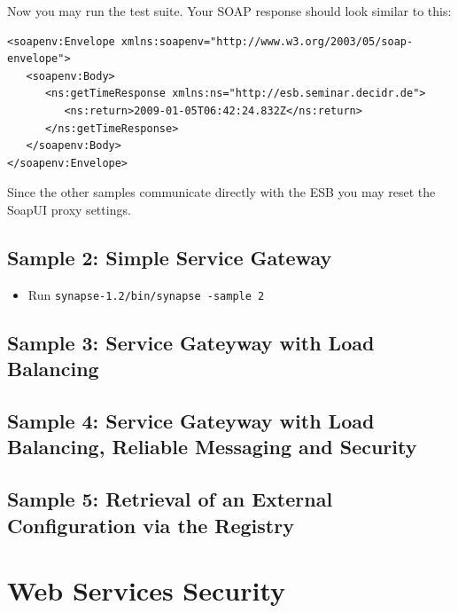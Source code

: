 Now you may run the test suite. Your SOAP response should look similar to this: 

\lstset{caption=, label=sample-1-result-xml}
\begin{lstlisting}
<soapenv:Envelope xmlns:soapenv="http://www.w3.org/2003/05/soap-envelope">
   <soapenv:Body>
      <ns:getTimeResponse xmlns:ns="http://esb.seminar.decidr.de">
         <ns:return>2009-01-05T06:42:24.832Z</ns:return>
      </ns:getTimeResponse>
   </soapenv:Body>
</soapenv:Envelope>
\end{lstlisting}

Since the other samples communicate directly with the ESB you may reset the
SoapUI proxy settings.

\subsection{Sample 2: Simple Service Gateway}
\label{sec:sample-2}



\begin{itemize}
  \item Run \texttt{synapse-1.2/bin/synapse -sample 2}
\end{itemize}

\lstset{caption=, label=sample-2-xml}



\subsection{Sample 3: Service Gateyway with Load Balancing}
\label{sec:sample-3}

\subsection{Sample 4: Service Gateyway with Load Balancing, Reliable Messaging
and Security}
\label{sec:sample-4}

\subsection{Sample 5: Retrieval of an External Configuration via the Registry}
\label{sec:sample-5}


\newpage
\section{Web Services Security}
\label{chap:web-services-security}

